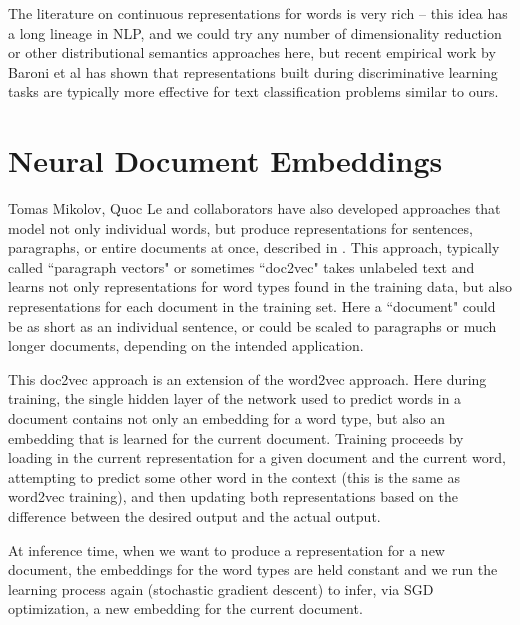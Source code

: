 The literature on continuous representations for words is very rich -- this
idea has a long lineage in NLP, and we could try any number of dimensionality
reduction or other distributional semantics approaches here, but recent
empirical work by Baroni et al \cite{baroni2014don} has shown that
representations built during discriminative learning tasks are typically more
effective for text classification problems similar to ours.


\section{Neural Document Embeddings}
Tomas Mikolov, Quoc Le and collaborators have also developed approaches that
model not only individual words, but produce representations for sentences,
paragraphs, or entire documents at once, described in 
\cite{dai-document-embedding-2015,quocle-distributed-representations-2014}.
This approach, typically called ``paragraph vectors" or sometimes ``doc2vec"
takes unlabeled text and learns not only representations for word types found
in the training data, but also representations for each document in the
training set. Here a ``document" could be as short as an individual sentence,
or could be scaled to paragraphs or much longer documents, depending on the
intended application.

This doc2vec approach is an extension of the word2vec approach. Here during
training, the single hidden layer of the network used to predict words in a
document contains not only an embedding for a word type, but also an embedding
that is learned for the current document. Training proceeds by loading in the
current representation for a given document and the current word, attempting to
predict some other word in the context (this is the same as word2vec training),
and then updating both representations based on the difference between the
desired output and the actual output.

At inference time, when we want to produce a representation for a new document,
the embeddings for the word types are held constant and we run the learning
process again (stochastic gradient descent) to infer, via SGD optimization, a
new embedding for the current document.

